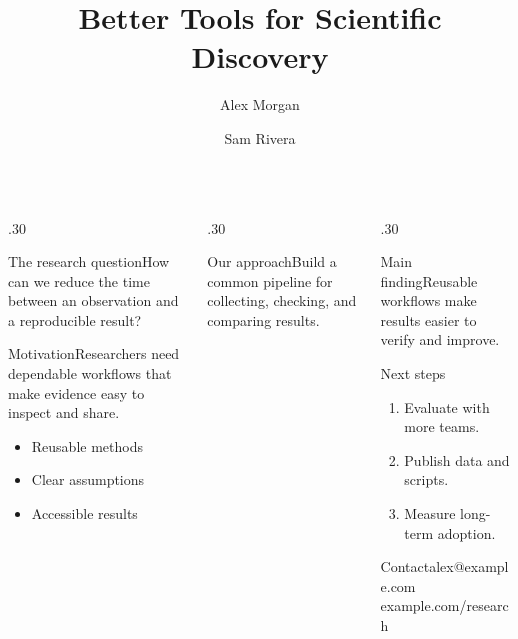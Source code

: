 \documentclass[final]{beamer}
\title{Better Tools for Scientific Discovery}\author{Alex Morgan \and Sam Rivera}\institute{Example Research Laboratory}
\begin{document}
\begin{frame}[t]\begin{columns}[t]
\begin{column}{.30\paperwidth}
\begin{block}{The research question}How can we reduce the time between an observation and a reproducible result?\end{block}
\begin{block}{Motivation}Researchers need dependable workflows that make evidence easy to inspect and share.\begin{itemize}\item Reusable methods\item Clear assumptions\item Accessible results\end{itemize}\end{block}
\end{column}
\begin{column}{.30\paperwidth}
\begin{block}{Our approach}Build a common pipeline for collecting, checking, and comparing results.\vspace{1cm}\begin{center}\end{center}\end{block}
\end{column}
\begin{column}{.30\paperwidth}
\begin{alertblock}{Main finding}Reusable workflows make results easier to verify and improve.\end{alertblock}
\begin{block}{Next steps}\begin{enumerate}\item Evaluate with more teams.\item Publish data and scripts.\item Measure long-term adoption.\end{enumerate}\end{block}
\begin{block}{Contact}alex@example.com\\example.com/research\end{block}
\end{column}\end{columns}\end{frame}
\end{document}
